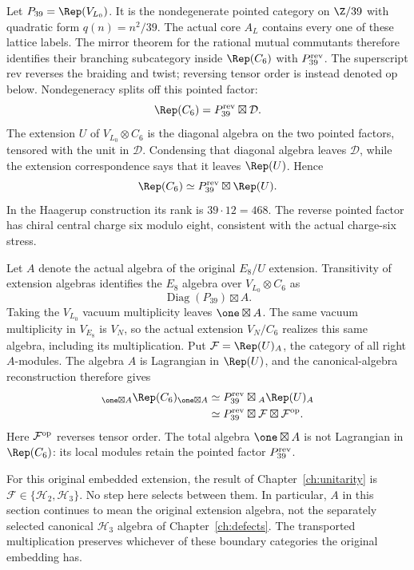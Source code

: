 Let $P_{39}=\Rep(V_{L_0})$. It is the nondegenerate pointed category
on $\Z/39$ with quadratic form $q(n)=n^2/39$. The actual core
$A_L$ contains every one of these lattice labels. The mirror theorem
for the rational mutual commutants therefore identifies their branching
subcategory inside $\Rep(C_6)$ with $P_{39}^{\rm rev}$.
The superscript $\mathrm{rev}$ reverses the braiding and twist;
reversing tensor order is instead denoted $\mathrm{op}$ below.
Nondegeneracy splits off this pointed factor:
\[
 \Rep(C_6)=P_{39}^{\rm rev}\boxtimes\mathcal D.
\]
The extension $U$ of $V_{L_0}\otimes C_6$ is the diagonal algebra
on the two pointed factors, tensored with the unit in $\mathcal D$.
Condensing that diagonal algebra leaves $\mathcal D$, while the
extension correspondence says that it leaves $\Rep(U)$. Hence
\begin{equation}\label{eq:c-C6-category}
 \Rep(C_6)\simeq P_{39}^{\rm rev}\boxtimes\Rep(U).
\end{equation}
In the Haagerup construction its rank is $39\cdot12=468$.
The reverse pointed factor has chiral central charge six modulo eight,
consistent with the actual charge-six stress.

Let $A$ denote the actual algebra of the original $E_8/U$ extension.
Transitivity of extension algebras identifies the $E_8$ algebra over
$V_{L_0}\otimes C_6$ as
\[
 \operatorname{Diag}(P_{39})\boxtimes A.
\]
Taking the $V_{L_0}$ vacuum multiplicity leaves $\one\boxtimes A$.
The same vacuum multiplicity in $V_{E_8}$ is $V_N$, so the actual
extension $V_N/C_6$ realizes this same algebra, including its
multiplication. Put $\mathcal F=\Rep(U)_A$, the category of all
right $A$-modules. The algebra $A$ is Lagrangian in $\Rep(U)$,
and the canonical-algebra reconstruction therefore gives
\begin{equation}\label{eq:c-C6-defects}
 \begin{aligned}
 {}_{\one\boxtimes A}\Rep(C_6)_{\one\boxtimes A}
 &\simeq P_{39}^{\rm rev}\boxtimes{}_A\Rep(U)_A\\
 &\simeq P_{39}^{\rm rev}\boxtimes
                 \mathcal F\boxtimes\mathcal F^{\rm op}.
 \end{aligned}
\end{equation}
Here $\mathcal F^{\rm op}$ reverses tensor order. The total algebra
$\one\boxtimes A$ is not Lagrangian in $\Rep(C_6)$: its local
modules retain the pointed factor $P_{39}^{\rm rev}$.

For this original embedded extension, the result of
Chapter~\ref{ch:unitarity} is $\mathcal F\in\{\mathcal H_2,
\mathcal H_3\}$. No step here selects between them. In particular,
$A$ in this section continues to mean the original extension algebra,
not the separately selected canonical $\mathcal H_3$ algebra of
Chapter~\ref{ch:defects}. The transported multiplication preserves
whichever of these boundary categories the original embedding has.

